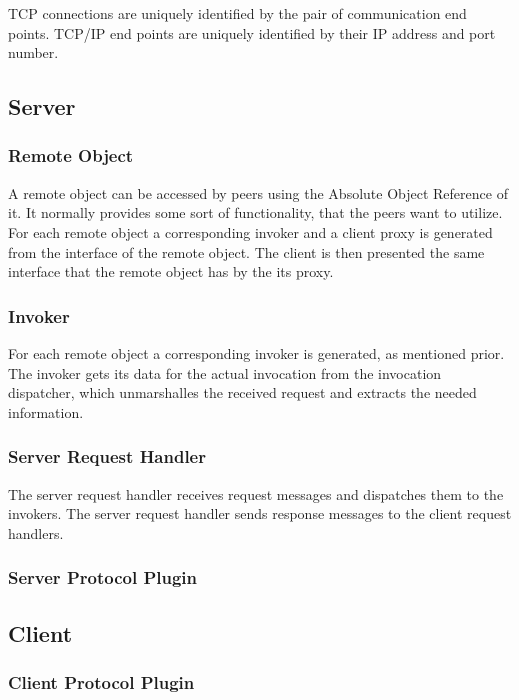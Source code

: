 TCP connections are uniquely identified by the pair of communication end points.
TCP/IP end points are uniquely identified by their IP address and port number.

\subsection{Server}

\subsubsection{Remote Object}
A remote object can be accessed by peers using the Absolute Object Reference of it. It normally provides some sort of functionality, that the peers want to utilize. For each remote object a corresponding invoker and a client proxy is generated from the interface of the remote object. The client is then presented the same interface that the remote object has by the its proxy.

\subsubsection{Invoker}
For each remote object a corresponding invoker is generated, as mentioned prior. The invoker gets its data for the actual invocation from the invocation dispatcher, which unmarshalles the received request and extracts the needed information.

\subsubsection{Server Request Handler}

The server request handler receives request messages and dispatches them to the invokers.
The server request handler sends response messages to the client request handlers.

\subsubsection{Server Protocol Plugin}

\subsection{Client}

\subsubsection{Client Protocol Plugin}

